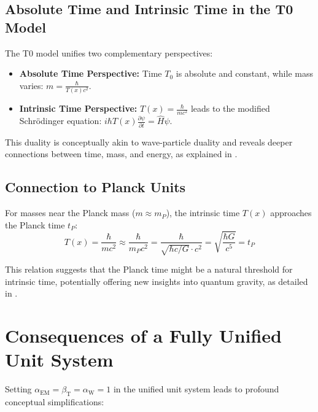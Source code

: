 \documentclass[12pt,a4paper]{article}
\newcommand{\Tfield}{T(x)}
\newcommand{\betaT}{\beta_{\text{T}}}
\newcommand{\alphaEM}{\alpha_{\text{EM}}}
\newcommand{\alphaW}{\alpha_{\text{W}}}
\newcommand{\Tzero}{T_0}
\begin{document}
	\subsection{Absolute Time and Intrinsic Time in the T0 Model}
	\label{subsec:absolute_intrinsic}
	
	The T0 model unifies two complementary perspectives:
	\begin{itemize}
		\item \textbf{Absolute Time Perspective:} Time \(\Tzero\) is absolute and constant, while mass varies: \(m = \frac{\hbar}{\Tfield c^2}\).
		\item \textbf{Intrinsic Time Perspective:} \(\Tfield = \frac{\hbar}{m c^2}\) leads to the modified Schrödinger equation: \(i\hbar \Tfield \frac{\partial \psi}{\partial t} = \hat{H} \psi\).
	\end{itemize}
	
	This duality is conceptually akin to wave-particle duality and reveals deeper connections between time, mass, and energy, as explained in \cite{pascher_zeit_2025}.
	
	\subsection{Connection to Planck Units}
	\label{subsec:planck_connection}
	
	For masses near the Planck mass (\(m \approx m_P\)), the intrinsic time \(\Tfield\) approaches the Planck time \(t_P\):
	\begin{equation}
		\Tfield = \frac{\hbar}{m c^2} \approx \frac{\hbar}{m_P c^2} = \frac{\hbar}{\sqrt{\hbar c/G} \cdot c^2} = \sqrt{\frac{\hbar G}{c^5}} = t_P
	\end{equation}
	
	This relation suggests that the Planck time might be a natural threshold for intrinsic time, potentially offering new insights into quantum gravity, as detailed in \cite{pascher_planck_2025}.
	
	\section{Consequences of a Fully Unified Unit System}
	\label{sec:fully_unified}
	
	Setting \(\alphaEM = \betaT = \alphaW = 1\) in the unified unit system leads to profound conceptual simplifications:
	
\end{document}
